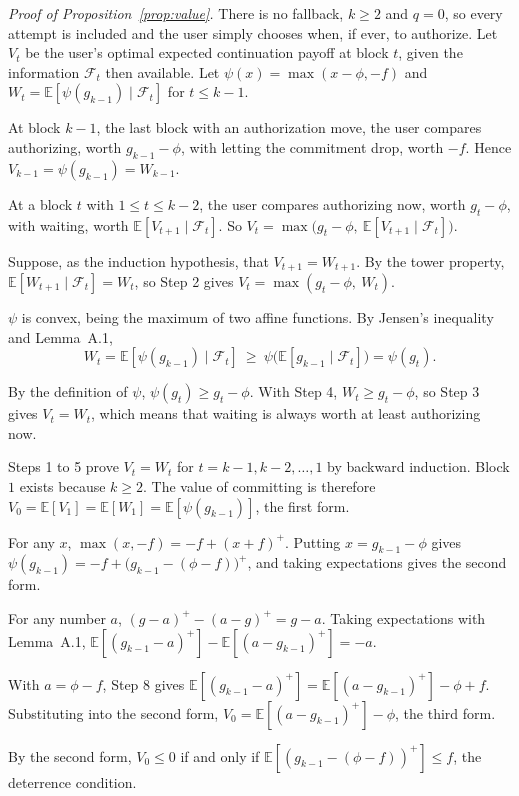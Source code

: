 \documentclass[11pt]{article}
\newcommand{\E}{\mathbb{E}}
\newenvironment{steps}{\begin{list}{}{\setlength{\leftmargin}{3.6em}\setlength{\labelwidth}{3.2em}\setlength{\labelsep}{0.4em}\setlength{\itemsep}{2pt}\setlength{\topsep}{3pt}\setlength{\parsep}{0pt}\renewcommand{\makelabel}[1]{##1\hfil}}}{\end{list}}
\begin{document}
\emph{Proof of Proposition~\ref{prop:value}.} There is no fallback, $k\ge2$ and $q=0$, so every attempt is included and the user simply chooses when, if ever, to authorize. Let $V_t$ be the user's optimal expected continuation payoff at block $t$, given the information $\mathcal F_t$ then available. Let $\psi(x)=\max(x-\phi,-f)$ and $W_t=\E[\psi(g_{k-1})\mid\mathcal F_t]$ for $t\le k-1$.
\begin{steps}
\item[\emph{Step 1.}] At block $k-1$, the last block with an authorization move, the user compares authorizing, worth $g_{k-1}-\phi$, with letting the commitment drop, worth $-f$. Hence $V_{k-1}=\psi(g_{k-1})=W_{k-1}$.
\item[\emph{Step 2.}] At a block $t$ with $1\le t\le k-2$, the user compares authorizing now, worth $g_t-\phi$, with waiting, worth $\E[V_{t+1}\mid\mathcal F_t]$. So $V_t=\max\big(g_t-\phi,\ \E[V_{t+1}\mid\mathcal F_t]\big)$.
\item[\emph{Step 3.}] Suppose, as the induction hypothesis, that $V_{t+1}=W_{t+1}$. By the tower property, $\E[W_{t+1}\mid\mathcal F_t]=W_t$, so Step 2 gives $V_t=\max(g_t-\phi,\ W_t)$.
\item[\emph{Step 4.}] $\psi$ is convex, being the maximum of two affine functions. By Jensen's inequality and Lemma~A.1,
\[W_t=\E[\psi(g_{k-1})\mid\mathcal F_t]\ \ge\ \psi\big(\E[g_{k-1}\mid\mathcal F_t]\big)=\psi(g_t).\]
\item[\emph{Step 5.}] By the definition of $\psi$, $\psi(g_t)\ge g_t-\phi$. With Step 4, $W_t\ge g_t-\phi$, so Step 3 gives $V_t=W_t$, which means that waiting is always worth at least authorizing now.
\item[\emph{Step 6.}] Steps 1 to 5 prove $V_t=W_t$ for $t=k-1,k-2,\dots,1$ by backward induction. Block $1$ exists because $k\ge2$. The value of committing is therefore $V_0=\E[V_1]=\E[W_1]=\E[\psi(g_{k-1})]$, the first form.
\item[\emph{Step 7.}] For any $x$, $\max(x,-f)=-f+(x+f)^+$. Putting $x=g_{k-1}-\phi$ gives $\psi(g_{k-1})=-f+\big(g_{k-1}-(\phi-f)\big)^+$, and taking expectations gives the second form.
\item[\emph{Step 8.}] For any number $a$, $(g-a)^+-(a-g)^+=g-a$. Taking expectations with Lemma~A.1, $\E[(g_{k-1}-a)^+]-\E[(a-g_{k-1})^+]=-a$.
\item[\emph{Step 9.}] With $a=\phi-f$, Step 8 gives $\E[(g_{k-1}-a)^+]=\E[(a-g_{k-1})^+]-\phi+f$. Substituting into the second form, $V_0=\E[(a-g_{k-1})^+]-\phi$, the third form.
\item[\emph{Step 10.}] By the second form, $V_0\le0$ if and only if $\E[(g_{k-1}-(\phi-f))^+]\le f$, the deterrence condition.

\end{steps}
\end{document}
